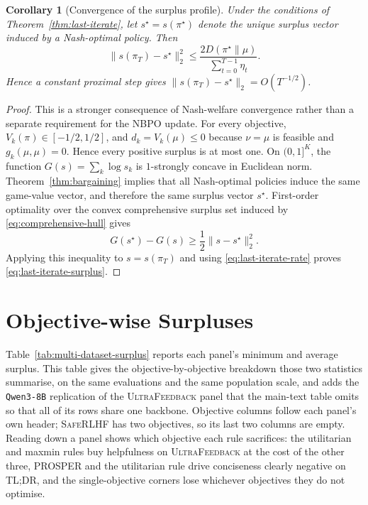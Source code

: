 \documentclass{article}
\newtheorem{corollary}{Corollary}
\theoremstyle{remark}
\theoremstyle{plain}
\begin{document}
\begin{corollary}[Convergence of the surplus profile]
\label{cor:surplus-convergence}
Under the conditions of Theorem~\ref{thm:last-iterate}, let
$s^\star=s(\pi^\star)$ denote the unique surplus vector induced by a
Nash-optimal policy. Then
\begin{equation}
\|s(\pi_T)-s^\star\|_2^2
\le
\frac{2D(\pi^\star\|\mu)}
{\sum_{t=0}^{T-1}\eta_t}.
\label{eq:last-iterate-surplus}
\end{equation}
Hence a constant proximal step gives
$\|s(\pi_T)-s^\star\|_2=O(T^{-1/2})$.
\end{corollary}

\begin{proof}
This is a stronger consequence of Nash-welfare convergence rather than a
separate requirement for the NBPO update. For every objective,
$V_k(\pi)\in[-1/2,1/2]$, and
$d_k=V_k(\mu)\le0$ because $\nu=\mu$ is feasible and
$g_k(\mu,\mu)=0$. Hence every positive surplus is at most one. On
$(0,1]^K$, the function
$G(s)=\sum_k\log s_k$ is $1$-strongly concave in Euclidean norm.
Theorem~\ref{thm:bargaining} implies that all Nash-optimal policies induce the
same game-value vector, and therefore the same surplus vector $s^\star$.
First-order optimality over the convex comprehensive surplus set induced by
\eqref{eq:comprehensive-hull} gives
\begin{equation}
G(s^\star)-G(s)
\ge
\frac12\|s-s^\star\|_2^2.
\label{eq:surplus-strong-concavity}
\end{equation}
Applying this inequality to $s=s(\pi_T)$ and using
\eqref{eq:last-iterate-rate} proves \eqref{eq:last-iterate-surplus}.
\end{proof}

\section{Objective-wise Surpluses}
\label{app:objectivewise}
Table~\ref{tab:multi-dataset-surplus} reports each panel's minimum and average surplus. This table gives
the objective-by-objective breakdown those two statistics summarise, on the same evaluations and the same
population scale, and adds the \texttt{Qwen3-8B} replication of the \textsc{UltraFeedback} panel that the
main-text table omits so that all of its rows share one backbone. Objective columns follow each panel's own
header; \textsc{SafeRLHF} has two objectives, so its last two columns are empty. Reading down a panel shows
which objective each rule sacrifices: the utilitarian and maxmin rules buy helpfulness on
\textsc{UltraFeedback} at the cost of the other three, PROSPER and the utilitarian rule drive conciseness
clearly negative on \textsc{TL;DR}, and the single-objective corners lose whichever objectives they do not
optimise.
\end{document}
